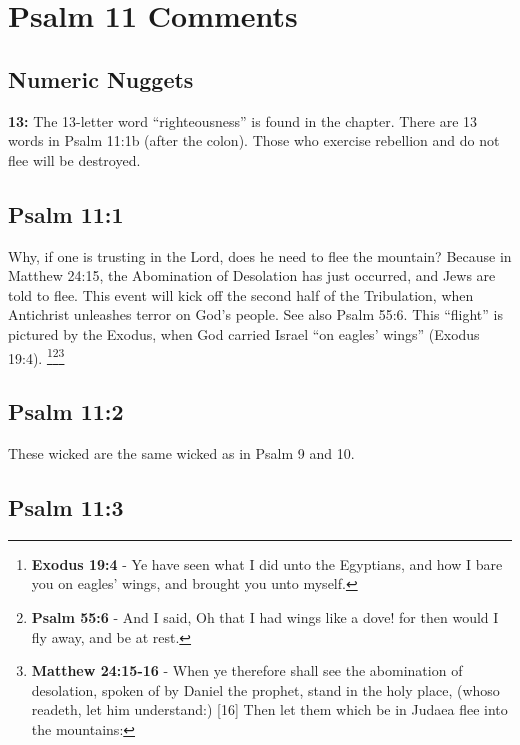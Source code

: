 \section{Psalm 11 Comments}

\subsection{Numeric Nuggets}
\textbf{13:} The 13-letter word ``righteousness'' is found in the chapter.   
There are 13 words in Psalm 11:1b (after the colon). Those who exercise rebellion and do not flee will be destroyed.

\subsection{Psalm 11:1}
Why, if one is trusting in the Lord, does he need to flee the mountain? Because in Matthew 24:15, the Abomination of Desolation has just occurred, and Jews are told to flee. This event will kick off the second half of the Tribulation, when Antichrist unleashes terror on God's people. See also Psalm 55:6. This ``flight'' is pictured by the Exodus, when God carried Israel ``on eagles' wings'' (Exodus 19:4). \cite{Ruckman1992PsalmsV1}\footnote{\textbf{Exodus 19:4} - Ye have seen what I did unto the Egyptians, and how I bare you on eagles' wings, and brought you unto myself.}\footnote{\textbf{Psalm 55:6} - And I said, Oh that I had wings like a dove! for then would I fly away, and be at rest.}\footnote{\textbf{Matthew 24:15-16} - When ye therefore shall see the abomination of desolation, spoken of by Daniel the prophet, stand in the holy place, (whoso readeth, let him understand:) [16] Then let them which be in Judaea flee into the mountains:}


\subsection{Psalm 11:2}
These wicked are the same wicked as in Psalm 9 and 10.

\subsection{Psalm 11:3}
